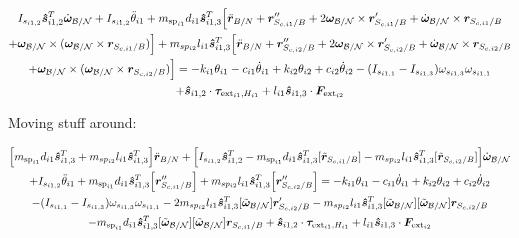 \documentclass[paper]{aiaaNew}
\begin{document}
\begin{multline}
I_{s_{i1,2}} \bm{\hat{s}}_{i1,2}^T \dot{\bm \omega}_{\cal{B/N}} + I_{s_{i1,2}} \ddot{\theta}_{i1} + m_{\text{sp}_{i1}} d_{i1} \bm{\hat{s}}_{i1,3}^T \Big[\ddot{\bm{r}}_{B/N} + \bm{r}''_{S_{c,i1}/B} + 2 \bm\omega_{\cal B/N} \times \bm{r}'_{S_{c,i1}/B} +  \dot{\bm\omega}_{\cal B/N} \times \bm{r}_{S_{c,i1}/B} \\
+ \bm\omega_{\cal B/N} \times (\bm\omega_{\cal B/N} \times \bm{r}_{S_{c,i1}/B})\Big] + m_{sp_{i2}} l_{i1} \bm{\hat{s}}_{i1,3}^T \Big[\ddot{\bm{r}}_{B/N} + \bm{r}''_{S_{c,i2}/B} + 2 \bm\omega_{\cal B/N} \times \bm{r}'_{S_{c,i2}/B} +  \dot{\bm\omega}_{\cal B/N} \times \bm{r}_{S_{c,i2}/B} \\
+ \bm\omega_{\cal B/N} \times (\bm\omega_{\cal B/N} \times \bm{r}_{S_{c,i2}/B})\Big]
= -k_{i1} \theta_{i1} - c_{i1} \dot{\theta}_{i1} + k_{i2} \theta_{i2} + c_{i2} \dot{\theta}_{i2} - (I_{s_{i1,1}} - I_{s_{i1,3}}) \omega_{s_{i1,3}} \omega_{s_{i1,1}} \\
+ \bm{\hat{s}}_{i1,2} \cdot \bm \tau_{\text{ext}_{i1},H_{i1}}
+ l_{i1} \bm{\hat{s}}_{i1,3} \cdot \bm F_{\text{ext}_{i2}} 
\end{multline}

Moving stuff around:

\begin{multline}
\Big[m_{\text{sp}_{i1}} d_{i1} \bm{\hat{s}}_{i1,3}^T + m_{sp_{i2}} l_{i1} \bm{\hat{s}}_{i1,3}^T \Big] \ddot{\bm{r}}_{B/N} + \Big[I_{s_{i1,2}} \bm{\hat{s}}_{i1,2}^T - m_{\text{sp}_{i1}} d_{i1} \bm{\hat{s}}_{i1,3}^T [\tilde{\bm{r}}_{S_{c,i1}/B}] - m_{sp_{i2}} l_{i1} \bm{\hat{s}}_{i1,3}^T [\tilde{\bm{r}}_{S_{c,i2}/B}] \Big] \dot{\bm \omega}_{\cal{B/N}} \\
+ I_{s_{i1,2}} \ddot{\theta}_{i1} + m_{\text{sp}_{i1}} d_{i1} \bm{\hat{s}}_{i1,3}^T \Big[ \bm{r}''_{S_{c,i1}/B} 
\Big] + m_{sp_{i2}} l_{i1} \bm{\hat{s}}_{i1,3}^T \Big[ \bm{r}''_{S_{c,i2}/B}\Big]
= -k_{i1} \theta_{i1} - c_{i1} \dot{\theta}_{i1} + k_{i2} \theta_{i2} + c_{i2} \dot{\theta}_{i2} \\
- (I_{s_{i1,1}} - I_{s_{i1,3}}) \omega_{s_{i1,3}} \omega_{s_{i1,1}} 
- 2 m_{sp_{i2}} l_{i1} \bm{\hat{s}}_{i1,3}^T [\tilde{\bm\omega}_{\cal B/N}] \bm{r}'_{S_{c,i2}/B}
- m_{sp_{i2}} l_{i1} \bm{\hat{s}}_{i1,3}^T [\tilde{\bm\omega}_{\cal B/N}] [\tilde{\bm\omega}_{\cal B/N}] \bm{r}_{S_{c,i2}/B}\\ 
- m_{\text{sp}_{i1}} d_{i1} \bm{\hat{s}}_{i1,3}^T [\tilde{\bm\omega}_{\cal B/N}] [\tilde{\bm\omega}_{\cal B/N}] \bm{r}_{S_{c,i1}/B}
+ \bm{\hat{s}}_{i1,2} \cdot \bm \tau_{\text{ext}_{i1},H_{i1}}
+ l_{i1} \bm{\hat{s}}_{i1,3} \cdot \bm F_{\text{ext}_{i2}} 
\end{multline}
\end{document}
